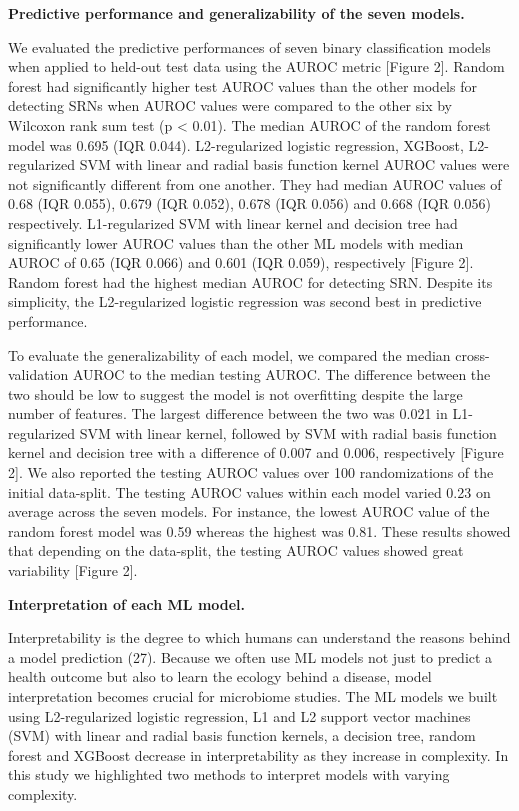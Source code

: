\documentclass[11pt,]{article}
\begin{document}
\textbf{Predictive performance and generalizability of the seven
models.}

We evaluated the predictive performances of seven binary classification
models when applied to held-out test data using the AUROC metric
{[}Figure 2{]}. Random forest had significantly higher test AUROC values
than the other models for detecting SRNs when AUROC values were compared
to the other six by Wilcoxon rank sum test (p \textless{} 0.01). The
median AUROC of the random forest model was 0.695 (IQR 0.044).
L2-regularized logistic regression, XGBoost, L2-regularized SVM with
linear and radial basis function kernel AUROC values were not
significantly different from one another. They had median AUROC values
of 0.68 (IQR 0.055), 0.679 (IQR 0.052), 0.678 (IQR 0.056) and 0.668 (IQR
0.056) respectively. L1-regularized SVM with linear kernel and decision
tree had significantly lower AUROC values than the other ML models with
median AUROC of 0.65 (IQR 0.066) and 0.601 (IQR 0.059), respectively
{[}Figure 2{]}. Random forest had the highest median AUROC for detecting
SRN. Despite its simplicity, the L2-regularized logistic regression was
second best in predictive performance.

To evaluate the generalizability of each model, we compared the median
cross-validation AUROC to the median testing AUROC. The difference
between the two should be low to suggest the model is not overfitting
despite the large number of features. The largest difference between the
two was 0.021 in L1-regularized SVM with linear kernel, followed by SVM
with radial basis function kernel and decision tree with a difference of
0.007 and 0.006, respectively {[}Figure 2{]}. We also reported the
testing AUROC values over 100 randomizations of the initial data-split.
The testing AUROC values within each model varied 0.23 on average across
the seven models. For instance, the lowest AUROC value of the random
forest model was 0.59 whereas the highest was 0.81. These results showed
that depending on the data-split, the testing AUROC values showed great
variability {[}Figure 2{]}.

\textbf{Interpretation of each ML model.}

Interpretability is the degree to which humans can understand the
reasons behind a model prediction (27). Because we often use ML models
not just to predict a health outcome but also to learn the ecology
behind a disease, model interpretation becomes crucial for microbiome
studies. The ML models we built using L2-regularized logistic
regression, L1 and L2 support vector machines (SVM) with linear and
radial basis function kernels, a decision tree, random forest and
XGBoost decrease in interpretability as they increase in complexity. In
this study we highlighted two methods to interpret models with varying
complexity.
\end{document}
